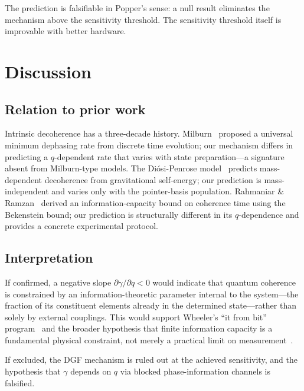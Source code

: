 \documentclass[aps,prl,twocolumn,superscriptaddress,hyperref]{revtex4-2}
\begin{document}
The prediction is falsifiable in Popper's sense: a null result eliminates the mechanism above the sensitivity threshold. The sensitivity threshold itself is improvable with better hardware.

\section{Discussion}

\subsection{Relation to prior work}

Intrinsic decoherence has a three-decade history. Milburn~\cite{Milburn:1991} proposed a universal minimum dephasing rate from discrete time evolution; our mechanism differs in predicting a $q$-dependent rate that varies with state preparation---a signature absent from Milburn-type models. The Di\'osi-Penrose model~\cite{Diosi:1987,Penrose:1996} predicts mass-dependent decoherence from gravitational self-energy; our prediction is mass-independent and varies only with the pointer-basis population. Rahmaniar \& Ramzan~\cite{Rahmaniar:2026} derived an information-capacity bound on coherence time using the Bekenstein bound; our prediction is structurally different in its $q$-dependence and provides a concrete experimental protocol.

\subsection{Interpretation}

If confirmed, a negative slope $\partial\gamma/\partial q < 0$ would indicate that quantum coherence is constrained by an information-theoretic parameter internal to the system---the fraction of its constituent elements already in the determined state---rather than solely by external couplings. This would support Wheeler's ``it from bit'' program~\cite{Wheeler:1989} and the broader hypothesis that finite information capacity is a fundamental physical constraint, not merely a practical limit on measurement~\cite{Bekenstein:1981}.

If excluded, the DGF mechanism is ruled out at the achieved sensitivity, and the hypothesis that $\gamma$ depends on $q$ via blocked phase-information channels is falsified.
\end{document}
